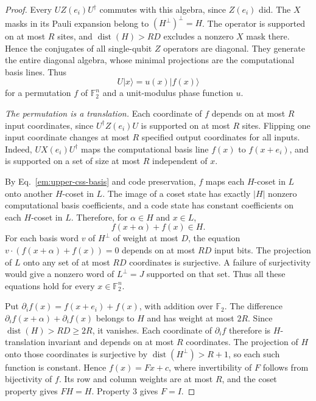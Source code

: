 \documentclass[aps,prl,reprint,longbibliography,nofootinbib,nobibnotes]{revtex4-2}
\begin{document}
\begin{proof}
Every $UZ(e_i)U^\dagger$ commutes with this algebra, since $Z(e_i)$ did. The $X$ masks in its Pauli
expansion belong to $(H^\perp)^\perp=H$. The operator is supported on at most $R$ sites, and
$\operatorname{dist}(H)>RD$ excludes a nonzero $X$ mask there. Hence the conjugates of all
single-qubit $Z$ operators are diagonal. They generate the entire diagonal algebra, whose minimal
projections are the computational basis lines. Thus
\begin{equation}\label{em:upper-monomial}
 U|x\rangle=u(x)|f(x)\rangle
\end{equation}
for a permutation $f$ of $\mathbb F_2^n$ and a unit-modulus phase function $u$.

\emph{The permutation is a translation.}
Each coordinate of $f$ depends on at most $R$ input coordinates, since $U^\dagger Z(e_i)U$ is
supported on at most $R$ sites. Flipping one input coordinate changes at most $R$ specified output
coordinates for all inputs. Indeed, $UX(e_i)U^\dagger$ maps the computational basis line $f(x)$ to
$f(x+e_i)$, and is supported on a set of size at most $R$ independent of $x$.

By Eq.~\eqref{em:upper-css-basis} and code preservation, $f$ maps each $H$-coset in $L$ onto
another $H$-coset in $L$. The image of a coset state has exactly $|H|$ nonzero computational basis
coefficients, and a code state has constant coefficients on each $H$-coset in $L$. Therefore, for
$\alpha\in H$ and $x\in L$,
\[
 f(x+\alpha)+f(x)\in H .
\]
For each basis word $v$ of $H^\perp$ of weight at most $D$, the equation
$v\cdot(f(x+\alpha)+f(x))=0$ depends on at most $RD$ input bits. The projection of $L$ onto any set
of at most $RD$ coordinates is surjective. A failure of surjectivity would give a nonzero word of
$L^\perp=J$ supported on that set. Thus all these equations hold for every $x\in\mathbb F_2^n$.

Put $\partial_i f(x)=f(x+e_i)+f(x)$, with addition over $\mathbb F_2$. The difference $\partial_i
f(x+\alpha)+\partial_i f(x)$ belongs to $H$ and has weight at most $2R$. Since
$\operatorname{dist}(H)>RD\ge2R$, it vanishes. Each coordinate of $\partial_i f$ therefore is
$H$-translation invariant and depends on at most $R$ coordinates. The projection of $H$ onto those
coordinates is surjective by $\operatorname{dist}(H^\perp)>R+1$, so each such function is constant.
Hence $f(x)=Fx+c$, where invertibility of $F$ follows from bijectivity of $f$. Its row and column
weights are at most $R$, and the coset property gives $FH=H$. Property 3 gives $F=I$.


\end{proof}
\end{document}
